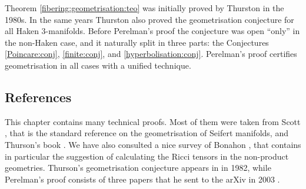 Theorem \ref{fibering:geometrisation:teo} was initially proved by Thurston in the 1980s. In the same years Thurston also proved the geometrisation conjecture for all Haken 3-manifolds. Before Perelman's proof the conjecture was open ``only'' in the non-Haken case, and it naturally split in three parts: the Conjectures \ref{Poincare:conj}, \ref{finite:conj}, and \ref{hyperbolisation:conj}. Perelman's proof certifies geometrisation in all cases with a unified technique.

\subsection{References}
This chapter contains many technical proofs. Most of them were taken from Scott \cite{S}, that is the standard reference on the geometrisation of Seifert manifolds, and Thurson's book \cite{Th_book}. We have also consulted a nice survey of Bonahon \cite{B3}, that contains in particular the suggestion of calculating the Ricci tensors in the non-product geometries. Thurson's geometrisation conjecture appears in \cite{Th_conj} in 1982, while Perelman's proof consists of three papers that he sent to the arXiv in 2003 \cite{Pe1, Pe2, Pe3}.

